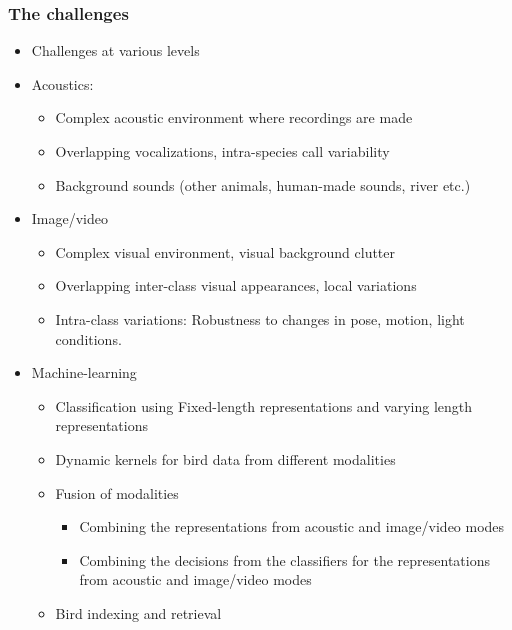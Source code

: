 \documentclass[mathserif]{beamer}
\begin{document}
\begin{frame}
\frametitle{The challenges}
\begin{itemize}
\item<2-> Challenges at various levels
\item<3-> Acoustics:
	\begin{itemize}
	\item<4-> Complex acoustic environment where recordings are made
	\item<5-> Overlapping vocalizations, intra-species call variability
	\item<7-> Background sounds (other animals, human-made sounds, river etc.)
	\end{itemize}
\item<8-> Image/video 
	\begin{itemize}
	\item<9-> Complex visual environment, visual background clutter
	\item<10-> Overlapping inter-class visual appearances, local variations  
	\item<11-> Intra-class variations: Robustness to changes in pose, motion, light conditions.
	\end{itemize}
\item<15-> Machine-learning
	\begin{itemize}
	\item<16-> Classification using Fixed-length representations and varying length representations
	\item<17-> Dynamic kernels for bird data from different modalities
	\item<18-> Fusion of modalities
	\begin{itemize}
	    \item<19-> Combining the representations from acoustic and image/video modes
	    \item<20-> Combining the decisions from the classifiers for the representations from acoustic and image/video modes
	\end{itemize}
	\item<21-> Bird indexing and retrieval
	\end{itemize}
\end{itemize}
\end{frame}
\end{document}
